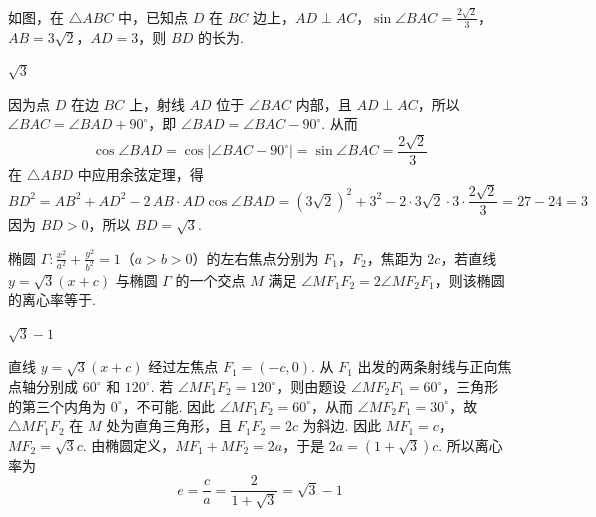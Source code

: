\begin{problem}
如图，在 \(\triangle ABC\) 中，已知点 \(D\) 在 \(BC\) 边上，\(AD \perp AC\)，\(\sin \angle BAC = \frac{2\sqrt{2}}{3}\)，\(AB = 3\sqrt{2}\)，\(AD = 3\)，则 \(BD\) 的长为\fillinblank{}.

\end{problem}

\begin{answer}
\(\sqrt{3}\)
\end{answer}

\begin{solution}
因为点 \(D\) 在边 \(BC\) 上，射线 \(AD\) 位于 \(\angle BAC\) 内部，且 \(AD\perp AC\)，所以
\(\angle BAC=\angle BAD+90^\circ\)，即 \(\angle BAD=\angle BAC-90^\circ\). 从而
\[
\cos\angle BAD=\cos\lvert\angle BAC-90^\circ\rvert=\sin\angle BAC=\frac{2\sqrt2}{3}
\]
在 \(\triangle ABD\) 中应用余弦定理，得
\[
BD^2=AB^2+AD^2-2\,AB\cdot AD\cos\angle BAD
=(3\sqrt2)^2+3^2-2\cdot3\sqrt2\cdot3\cdot\frac{2\sqrt2}{3}=27-24=3
\]
因为 \(BD>0\)，所以 \(BD=\sqrt3\).
\end{solution}

\begin{problem}
椭圆 \(\Gamma : \frac{x^{2}}{a^{2}} + \frac{y^{2}}{b^{2}} = 1\)（\(a > b > 0\)）的左右焦点分别为 \(F_1\)，\(F_2\)，焦距为 \(2c\)，若直线 \(y = \sqrt{3}(x + c)\) 与椭圆 \(\Gamma\) 的一个交点 \(M\) 满足 \(\angle MF_1F_2 = 2 \angle MF_2F_1\)，则该椭圆的离心率等于\fillinblank{}.
\end{problem}

\begin{answer}
\(\sqrt{3}-1\)
\end{answer}

\begin{solution}
直线 \(y=\sqrt3(x+c)\) 经过左焦点 \(F_1=(-c,0)\). 从 \(F_1\) 出发的两条射线与正向焦点轴分别成 \(60^\circ\) 和 \(120^\circ\). 若 \(\angle MF_1F_2=120^\circ\)，则由题设 \(\angle MF_2F_1=60^\circ\)，三角形的第三个内角为 \(0^\circ\)，不可能. 因此 \(\angle MF_1F_2=60^\circ\)，从而 \(\angle MF_2F_1=30^\circ\)，故 \(\triangle MF_1F_2\) 在 \(M\) 处为直角三角形，且 \(F_1F_2=2c\) 为斜边. 因此
\(MF_1=c\)，\(MF_2=\sqrt3c\).
由椭圆定义，\(MF_1+MF_2=2a\)，于是 \(2a=(1+\sqrt3)c\). 所以离心率为
\[
e=\frac ca=\frac{2}{1+\sqrt3}=\sqrt3-1
\]
\end{solution}

